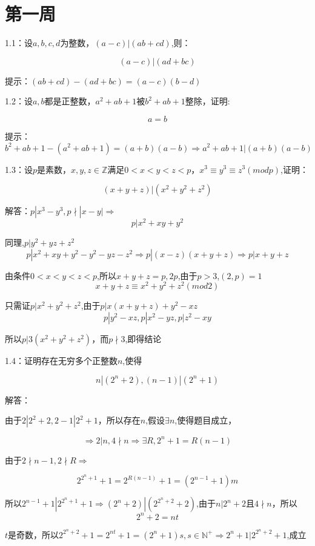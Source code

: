 \documentclass{ctexart}
\title{\LARGE\heiti {华罗庚协会讨论班部分题目答案}}
\author{华仔 }
\date{}
\begin{document}
\maketitle

\section{第一周}
1.1：设$a,b,c,d$为整数，$(a-c)|(ab+cd)$,则：

	\[
	(a-c)|(ad+bc)
	\]

提示：$(ab+cd)-(ad+bc)=(a-c)(b-d)$

1.2：设$a,b$都是正整数，$a^2+ab+1$被$b^2+ab+1$整除，证明:

	\[
	a=b
	\]

提示：
\[b^2+ab+1-
(a^2+ab+1)=(a+b)(a-b)\Rightarrow a^2+ab+1|(a+b)(a-b)\]

1.3：设$p$是素数，$x,y,z\in \mathbb{Z}$满足$0<x<y<z<p$，$x^3\equiv y^3\equiv z^3 (mod p)$,证明：
	
		\[
		(x+y+z)|(x^2+y^2+z^2)
		\]

解答：$p|x^3-y^3,p\nmid |x-y|\Rightarrow$
\[p|x^2+xy+y^2\]


同理,$p|y^2+yz+z^2$
\[p|x^2+xy+y^2-y^2-yz-z^2\Rightarrow p|(x-z)(x+y+z)\Rightarrow p|x+y+z\]


由条件$0<x<y<z<p$,所以$x+y+z=p,2p$,由于$p>3$,$(2,p)=1$
\[x+y+z\equiv x^2+y^2+z^2(mod2)\]


只需证$p|x^2+y^2+z^2$,由于$p|x(x+y+z)+y^2-xz$
\[p|y^2-xz,p|x^2-yz,p|z^2-xy\]


所以$p|3(x^2+y^2+z^2)$，而$p\nmid 3$,即得结论



1.4：证明存在无穷多个正整数$n$,使得
	
		\[
		n|(2^n+2),(n-1)|(2^n+1)
		\]

解答：

由于$2|2^2+2,2-1|2^2+1$，所以存在$n$,假设$\exists n$,使得题目成立，

\[\Rightarrow 2|n,4\nmid n\Rightarrow \exists R,2^n+1=R(n-1)\]

由于$2\nmid n-1,2\nmid R\Rightarrow $

\[2^{2^n+1}+1=2^{R(n-1)}+1=(2^{n-1}+1)m\]

所以$2^{n-1}+1|2^{2^n+1}+1\Rightarrow (2^n+2)|(2^{2^n+2}+2)$,由于$n|2^n+2$且$4\nmid n $，所以
\[2^n+2=nt\]

$t$是奇数，所以$2^{2^n+2}+1=2^{nt}+1=(2^n+1)s,s\in \mathbb{N}^{+}\Rightarrow 2^n+1|2^{2^n+2}+1$,成立
\end{document}
